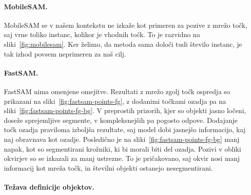 \documentclass[a4paper,twoside,openright,12pt,slovene]{book}
\begin{document}
        \paragraph{MobileSAM.}
        MobileSAM se v našem kontekstu ne izkaže kot primeren za pozive z mrežo
        točk, saj vrne toliko instanc, kolikor je vhodnih točk. To je razvidno
        na
        sliki~\ref{fig:mobilesam}.
        Ker želimo, da metoda sama določi tudi število instanc, je tak izhod
        povsem neprimeren za naš cilj.
        
        \paragraph{FastSAM.}
        FastSAM nima omenjene omejitve. Rezultati z mrežo zgolj točk ospredja
        so prikazani na
        sliki~\ref{fig:fastsam-points-fg},
        z dodanimi točkami ozadja pa na
        sliki~\ref{fig:fastsam-points-fg-bg}.
        V preprostih prizorih, kjer so objekti jasno ločeni, doseže
        sprejemljive segmente, v kompleksnejših pa pogosto odpove. Dodajanje
        točk ozadja praviloma izboljša rezultate, saj model dobi jasnejšo
        informacijo, kaj naj obravnava kot ozadje. Posledično je na
        sliki~\ref{fig:fastsam-points-fg-bg}
        manj
        napak, kot so segmentirani krožniki, ki bi morali biti del ozadja.
        Pozivi v obliki okvirjev so se izkazali za manj ustrezne. To je
        pričakovano, saj okvir nosi manj informacij kot mreža točk, in številni
        objekti ostanejo nesegmentirani.
        
        
        \paragraph{Težava definicije objektov.}
\end{document}
